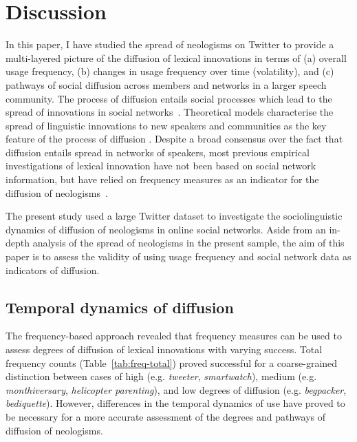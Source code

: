 \documentclass[
  a4paper,
  abstract=on,
  captions=tableabove,
  ]{scrartcl}
\newcommand{\ol}[1]{\emph{#1}}
\begin{document}
\section{Discussion}
  \label{sec:discussion}

  In this paper, I have studied the spread of neologisms on Twitter to provide a multi-layered picture of the diffusion of lexical innovations in terms of (a) overall usage frequency, (b) changes in usage frequency over time (volatility), and (c) pathways of social diffusion across members and networks in a larger speech community. The process of diffusion entails social processes which lead to the spread of innovations in social networks~\parencite{Rogers1962DiffusionInnovations}. Theoretical models characterise the spread of linguistic innovations to new speakers and communities as the key feature of the process of diffusion \parencite{Weinreich1968EmpiricalFoundations,Schmid2020DynamicsLinguistic}. Despite a broad consensus over the fact that diffusion entails spread in networks of speakers, most previous empirical investigations of lexical innovation have not been based on social network information, but have relied on frequency measures as an indicator for the diffusion of neologisms~\parencite{Stefanowitsch2017CorpusbasedPerspective}.

  The present study used a large Twitter dataset to investigate the sociolinguistic dynamics of diffusion of neologisms in online social networks. Aside from an in-depth analysis of the spread of neologisms in the present sample, the aim of this paper is to assess the validity of using usage frequency and social network data as indicators of diffusion.


  \subsection{Temporal dynamics of diffusion}

    The frequency-based approach revealed that frequency measures can be used to assess degrees of diffusion of lexical innovations with varying success. Total frequency counts (Table~\ref{tab:freq-total}) proved successful for a coarse-grained distinction between cases of high (e.g. \ol{tweeter}, \ol{smartwatch}), medium (e.g. \ol{monthiversary}, \ol{helicopter parenting}), and low degrees of diffusion (e.g. \ol{begpacker}, \ol{bediquette}). However, differences in the temporal dynamics of use have proved to be necessary for a more accurate assessment of the degrees and pathways of diffusion of neologisms.
\end{document}
